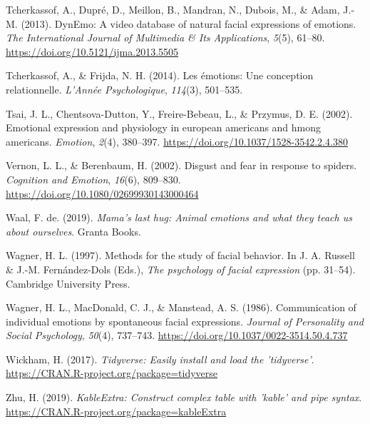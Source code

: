 \documentclass[
  english,
  man]{apa7}
\newlength{\cslhangindent}
\newenvironment{cslreferences}%
  {\setlength{\parindent}{0pt}%
  \everypar{\setlength{\hangindent}{\cslhangindent}}\ignorespaces}%
  {\par}
\begin{document}
\begin{cslreferences}
\leavevmode\hypertarget{ref-tcherkassof2013dynemo}{}%
Tcherkassof, A., Dupré, D., Meillon, B., Mandran, N., Dubois, M., \& Adam, J.-M. (2013). DynEmo: A video database of natural facial expressions of emotions. \emph{The International Journal of Multimedia \& Its Applications}, \emph{5}(5), 61--80. \url{https://doi.org/10.5121/ijma.2013.5505}

\leavevmode\hypertarget{ref-tcherkassof2014emotions}{}%
Tcherkassof, A., \& Frijda, N. H. (2014). Les émotions: Une conception relationnelle. \emph{L'Année Psychologique}, \emph{114}(3), 501--535.

\leavevmode\hypertarget{ref-tsai2002emotional}{}%
Tsai, J. L., Chentsova-Dutton, Y., Freire-Bebeau, L., \& Przymus, D. E. (2002). Emotional expression and physiology in european americans and hmong americans. \emph{Emotion}, \emph{2}(4), 380--397. \url{https://doi.org/10.1037/1528-3542.2.4.380}

\leavevmode\hypertarget{ref-vernon2002disgust}{}%
Vernon, L. L., \& Berenbaum, H. (2002). Disgust and fear in response to spiders. \emph{Cognition and Emotion}, \emph{16}(6), 809--830. \url{https://doi.org/10.1080/02699930143000464}

\leavevmode\hypertarget{ref-de2019mama}{}%
Waal, F. de. (2019). \emph{Mama's last hug: Animal emotions and what they teach us about ourselves}. Granta Books.

\leavevmode\hypertarget{ref-wagner1997methods}{}%
Wagner, H. L. (1997). Methods for the study of facial behavior. In J. A. Russell \& J.-M. Fernández-Dols (Eds.), \emph{The psychology of facial expression} (pp. 31--54). Cambridge University Press.

\leavevmode\hypertarget{ref-wagner1986communication}{}%
Wagner, H. L., MacDonald, C. J., \& Manstead, A. S. (1986). Communication of individual emotions by spontaneous facial expressions. \emph{Journal of Personality and Social Psychology}, \emph{50}(4), 737--743. \url{https://doi.org/10.1037/0022-3514.50.4.737}

\leavevmode\hypertarget{ref-R-tidyverse}{}%
Wickham, H. (2017). \emph{Tidyverse: Easily install and load the 'tidyverse'}. \url{https://CRAN.R-project.org/package=tidyverse}

\leavevmode\hypertarget{ref-R-kableExtra}{}%
Zhu, H. (2019). \emph{KableExtra: Construct complex table with 'kable' and pipe syntax}. \url{https://CRAN.R-project.org/package=kableExtra}
\end{cslreferences}

\endgroup
\end{document}
